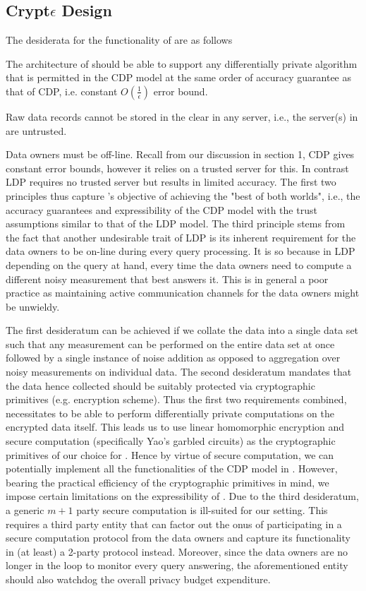 \subsection{Crypt$\epsilon$ Design}
The  desiderata for  the functionality of \system are as follows
\squishlist \item The architecture of \system should be able to support any differentially private algorithm that is permitted in the \textsf{CDP} model at the same order of accuracy guarantee as that of \textsf{CDP}, i.e. constant $O(\frac{1}{\epsilon})$ error bound.
\item Raw data records cannot be stored in the clear in any server, i.e., the server(s) in \system are untrusted. 
\item Data owners must be  off-line.\squishend
Recall from our discussion in section 1, \textsf{CDP} gives constant error bounds, however it relies on a trusted server for this. In contrast \textsf{LDP} requires no trusted server but results in limited accuracy.  The first two principles thus capture \system's objective of achieving the "best of both worlds", i.e., the accuracy guarantees and expressibility of the \textsf{CDP} model with the trust assumptions similar to that of the \textsf{LDP} model. The third principle stems from the fact that another undesirable trait of \textsf{LDP} is its inherent requirement for the data owners to be on-line during every query processing.  It is so because  in \textsf{LDP} %
depending on the query at hand, every time the data owners need to compute a different noisy measurement that best answers it. This is in general a poor practice as maintaining active communication channels for the data owners might be unwieldy. \par The first desideratum can be achieved if we collate the data into a single data set such that any measurement can be performed on the entire data set at once followed by a single instance of noise addition as opposed to aggregation over noisy measurements on individual data. The second desideratum mandates that the data hence collected should be suitably protected via cryptographic primitives (e.g. encryption scheme). Thus the first two requirements combined, necessitates \system to be able to perform differentially private computations on the encrypted data itself. This leads us to use linear homomorphic encryption and secure computation (specifically Yao's garbled circuits)  as the cryptographic primitives of our choice for \system. Hence by virtue of secure computation, we can potentially implement all the functionalities of the \textsf{CDP} model in \system. However, bearing the practical efficiency of the cryptographic primitives in mind, we impose certain limitations on the expressibility of \system. Due to the third desideratum, a generic $m+1$ party secure computation is ill-suited for our setting. This requires a third party entity that can factor out the onus of participating in a secure computation protocol from the data owners and capture its functionality in (at least) a 2-party protocol instead.   Moreover, since the data owners are no longer in the loop to monitor every query answering, the aforementioned entity should also watchdog the overall privacy budget expenditure. 
